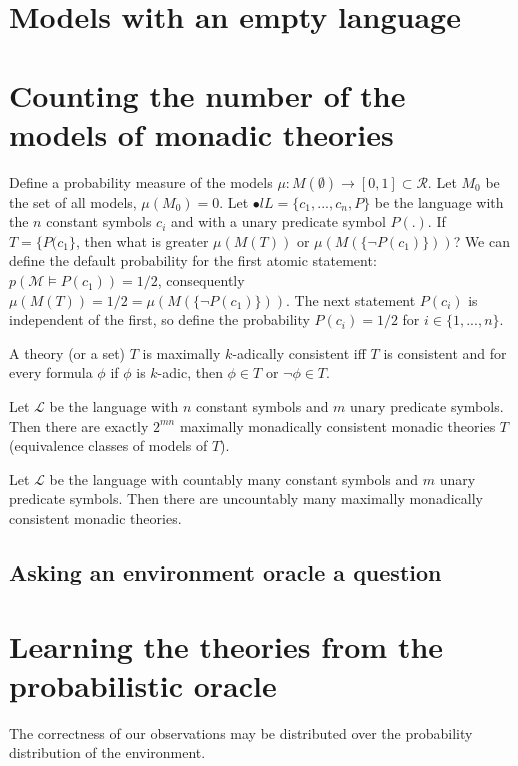 \section{Models with an empty language}
\fi

\iffalse
\section{Counting the number of the models of monadic theories}
Define a probability measure of the models $\mu:M(\emptyset) \to [0,1] \subset \mathcal{R}$. Let $M_0$ be the set of all models, $\mu(M_0)=0$. Let $\mathcal{•}l{L}=\{c_1, ..., c_n, P\}$ be the language with the $n$ constant symbols $c_i$ and with a unary predicate symbol $P(.)$. If $T=\{P(c_1\}$, then what is greater $\mu(M(T))$ or $\mu(M(\{\neg P(c_1)\}))$? We can define the default probability for the first atomic statement: $p(\mathcal{M} \models P(c_1))=1/2$, consequently $\mu(M(T))=1/2=\mu(M(\{\neg P(c_1)\}))$. The next statement $P(c_i)$ is independent of the first, so define the probability $P(c_i)=1/2$ for $i \in \{1, ..., n\}$.
\begin{defn}
A theory (or a set) $T$ is maximally $k$-adically consistent iff $T$ is consistent and for every formula $\phi$ if $\phi$ is $k$-adic, then $\phi \in T$ or $\neg \phi \in T$.
\end{defn}
\begin{remark}
Let $\mathcal{L}$ be the language with $n$ constant symbols and $m$ unary predicate symbols. Then there are exactly $2^{mn}$ maximally monadically consistent monadic theories $T$ (equivalence classes of models of $T$).
\end{remark}
\begin{remark}
Let $\mathcal{L}$ be the language with countably many constant symbols and $m$ unary predicate symbols. Then there are uncountably many maximally monadically consistent monadic theories.
\end{remark}
\subsection{Asking an environment oracle a question}
\subsection{}

\section{Learning the theories from the probabilistic oracle}
The correctness of our observations may be distributed over the probability distribution of the environment.
